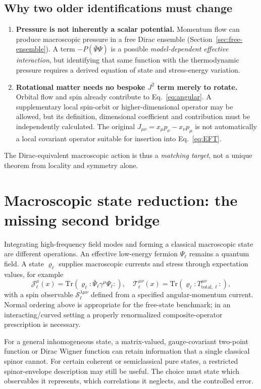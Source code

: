 \documentclass[11pt,a4paper]{article}
\newcommand{\TT}{\mathcal T}
\newcommand{\JJ}{\mathcal J}
\newcommand{\Spin}{\mathcal S}
\begin{document}
\subsection{Why two older identifications must change}
\begin{enumerate}
\item \textbf{Pressure is not inherently a scalar potential.} Momentum flow can produce macroscopic pressure in a free Dirac ensemble (Section~\ref{sec:free-ensemble}). A term $-P(\bar\Psi\Psi)$ is a possible \emph{model-dependent effective interaction}, but identifying that same function with the thermodynamic pressure requires a derived equation of state and stress-energy variation.
\item \textbf{Rotational matter needs no bespoke $J^2$ term merely to rotate.} Orbital flow and spin already contribute to Eq.~\eqref{eq:angular}. A supplementary local spin-orbit or higher-dimensional operator may be allowed, but its definition, dimensional coefficient and contribution must be independently calculated. The original $J_{\mu\nu}=x_\mu p_\nu-x_\nu p_\mu$ is not automatically a local covariant operator suitable for insertion into Eq.~\eqref{eq:EFT}.
\end{enumerate}
The Dirac-equivalent macroscopic action is thus a \emph{matching target}, not a unique theorem from locality and symmetry alone.

\section{Macroscopic state reduction: the missing second bridge}\label{sec:state}
Integrating high-frequency field modes and forming a classical macroscopic state are different operations. An effective low-energy fermion $\Psi_\ell$ remains a quantum field. A state $\varrho_\ell$ supplies macroscopic currents and stress through expectation values, for example
\begin{equation}\label{eq:macroobs}
\JJ^\mu_\ell(x)=\mathrm{Tr}(\varrho_\ell:\!\bar\Psi_\ell\gamma^\mu\Psi_\ell\!:),\quad
\TT^{\mu\nu}_\ell(x)=\mathrm{Tr}(\varrho_\ell:\!T_{\mathrm{total},\ell}^{\mu\nu}\!:),
\end{equation}
with a spin observable $\Spin^{\lambda\mu\nu}_\ell$ defined from a specified angular-momentum current. Normal ordering above is appropriate for the free-state benchmark; in an interacting/curved setting a properly renormalized composite-operator prescription is necessary.

For a general inhomogeneous state, a matrix-valued, gauge-covariant two-point function or Dirac Wigner function can retain information that a single classical spinor cannot. For certain coherent or semiclassical pure states, a restricted spinor-envelope description may still be useful. The choice must state which observables it represents, which correlations it neglects, and the controlled error.
\end{document}
